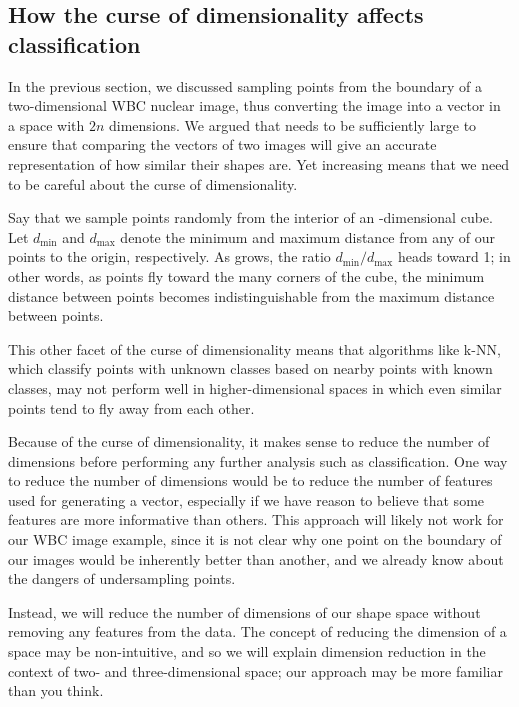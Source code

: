 \FloatBarrier
{}
\subsection{How the curse of dimensionality affects classification}

In the previous section, we discussed sampling  points from the boundary of a two-dimensional WBC nuclear image, thus converting the image into a vector in a space with $2n$ dimensions. We argued that  needs to be sufficiently large to ensure that comparing the vectors of two images will give an accurate representation of how similar their shapes are. Yet increasing  means that we need to be careful about the curse of dimensionality.

Say that we sample  points randomly from the interior of an -dimensional cube. Let $d_{\text{min}}$ and $d_{\text{max}}$ denote the minimum and maximum distance from any of our points to the origin, respectively. As  grows, the ratio $d_{\text{min}}/d_{\text{max}}$ heads toward 1; in other words, as points fly toward the many corners of the cube, the minimum distance between points becomes indistinguishable from the maximum distance between points.

This other facet of the curse of dimensionality means that algorithms like k-NN, which classify points with unknown classes based on nearby points with known classes, may not perform well in higher-dimensional spaces in which even similar points tend to fly away from each other.

Because of the curse of dimensionality, it makes sense to reduce the number of dimensions before performing any further analysis such as classification. One way to reduce the number of dimensions would be to reduce the number of features used for generating a vector, especially if we have reason to believe that some features are more informative than others. This approach will likely not work for our WBC image example, since it is not clear why one point on the boundary of our images would be inherently better than another, and we already know about the dangers of undersampling points.

Instead, we will reduce the number of dimensions of our shape space without removing any features from the data. The concept of reducing the dimension of a space may be non-intuitive, and so we will explain dimension reduction in the context of two- and three-dimensional space; our approach may be more familiar than you think.

